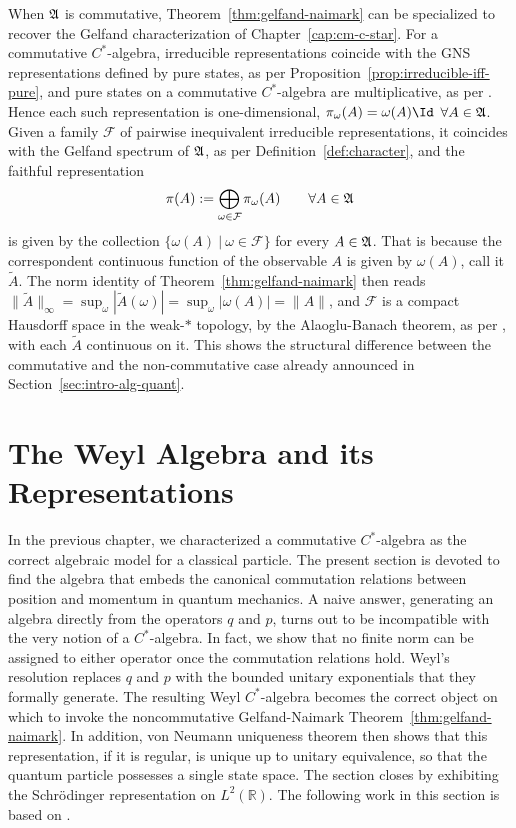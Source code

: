 \begin{remark}
	\label{rem:commutative-recovery}
	When $\mathfrak{A}$ is commutative, Theorem~\ref{thm:gelfand-naimark} can be specialized to recover the Gelfand characterization of Chapter~\ref{cap:cm-c-star}. For a commutative $C^*$-algebra, irreducible representations coincide with the GNS representations defined by pure states, as per Proposition~\ref{prop:irreducible-iff-pure}, and pure states on a commutative $C^*$-algebra are multiplicative, as per \cite[Prop.~2.6.3]{strocchiIntroductionMathematicalStructure2005}. Hence each such representation is one-dimensional, $\pi_\omega(A) = \omega(A)\Id$ $\forall A \in \mathfrak{A}$. Given a family $\mathcal F$ of pairwise inequivalent irreducible representations, it coincides with the Gelfand spectrum of $\mathfrak{A}$, as per Definition~\ref{def:character}, and the faithful representation 
	\[\pi(A) := \bigoplus_{\omega\in\mathcal F}\pi_\omega(A) \qquad \forall A \in \A\]
	is given by the collection $\{\omega(A) \ | \ \omega\in\mathcal F\}$ for every $A \in \mathfrak{A}$. That is because the correspondent continuous function of the observable $A$ is given by $\omega(A)$, call it $\widetilde A$. The norm identity of Theorem~\ref{thm:gelfand-naimark} then reads $\|\widetilde A\|_\infty = \sup_\omega|\widetilde A(\omega)| = \sup_\omega|\omega(A)| = \|A\|$, and $\mathcal F$ is a compact Hausdorff space in the weak-$*$ topology, by the Alaoglu-Banach theorem, as per \cite[Theorem IV.21]{reedMethodsModernMathematical2003}, with each $\widetilde A$ continuous on it. This shows the structural difference between the commutative and the non-commutative case already announced in Section~\ref{sec:intro-alg-quant}. 
\end{remark}

	\section{The Weyl Algebra and its Representations}
	
	In the previous chapter, we characterized a commutative $C^*$-algebra as the correct algebraic model for a classical particle. The present section is devoted to find the algebra that embeds the canonical commutation relations between position and momentum in quantum mechanics. A naive answer, generating an algebra directly from the operators $q$ and $p$, turns out to be incompatible with the very notion of a $C^*$-algebra. In fact, we show that no finite norm can be assigned to either operator once the commutation relations hold. Weyl's resolution replaces $q$ and $p$ with the bounded unitary exponentials that they formally generate. The resulting Weyl $C^*$-algebra becomes the correct object on which to invoke the noncommutative Gelfand-Naimark Theorem~\ref{thm:gelfand-naimark}. In addition, von Neumann uniqueness theorem then shows that this representation, if it is regular, is unique up to unitary equivalence, so that the quantum particle possesses a single state space. The section closes by exhibiting the Schr\"odinger representation on $L^2(\mathbb{R})$. The following work in this section is based on \cite[Chapter 3]{strocchiIntroductionMathematicalStructure2005}.
	
